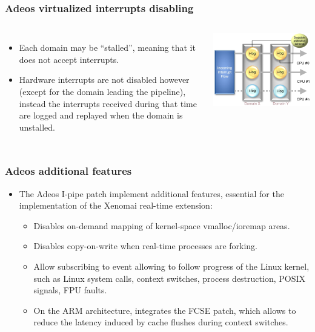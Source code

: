 \begin{frame}
  \frametitle{Adeos virtualized interrupts disabling}
  \begin{columns}
    \begin{itemize}
    \item Each domain may be “stalled”, meaning that it does not
      accept interrupts.
    \item Hardware interrupts are not disabled however (except for the
      domain leading the pipeline), instead the interrupts received
      during that time are logged and replayed when the domain is
      unstalled.
    \end{itemize}
    \includegraphics[width=\textwidth]{slides/sysdev-realtime/adeos-interrupt-pipeline2.jpg}
  \end{columns}
\end{frame}

\begin{frame}
  \frametitle{Adeos additional features}
  \begin{itemize}
  \item The Adeos I-pipe patch implement additional features,
    essential for the implementation of the Xenomai real-time
    extension:
    \begin{itemize}
    \item Disables on-demand mapping of kernel-space vmalloc/ioremap
      areas.
    \item Disables copy-on-write when real-time processes are forking.
    \item Allow subscribing to event allowing to follow progress of
      the Linux kernel, such as Linux system calls, context switches,
      process destruction, POSIX signals, FPU faults.
    \item On the ARM architecture, integrates the FCSE patch, which
      allows to reduce the latency induced by cache flushes during
      context switches.
    \end{itemize}
  \end{itemize}
\end{frame}

